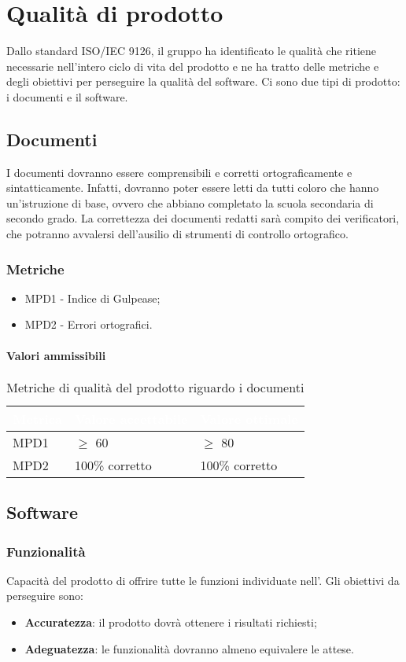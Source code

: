 \section{Qualità di prodotto}
Dallo standard ISO/IEC 9126, il gruppo \Gruppo{} ha identificato le qualità che ritiene necessarie nell'intero ciclo di vita del prodotto e ne ha tratto delle metriche e degli obiettivi per perseguire la qualità del software. Ci sono due tipi di prodotto: i documenti e il software.

\subsection{Documenti}
I documenti dovranno essere comprensibili e corretti ortograficamente e sintatticamente. Infatti, dovranno poter essere letti da tutti coloro che hanno un'istruzione di base, ovvero che abbiano completato la scuola secondaria di secondo grado. La correttezza dei documenti redatti sarà compito dei verificatori, che potranno avvalersi dell'ausilio di strumenti di controllo ortografico. 

\subsubsection{Metriche}
\begin{itemize}
\item MPD1 - Indice di Gulpease;
\item MPD2 - Errori ortografici.
\end{itemize} 
\paragraph{Valori ammissibili}
\renewcommand{\arraystretch}{1.5}
\begin{longtable}{C{2.5cm} C{4cm} C{4cm}}
\textcolor{white}{\textbf{Metrica}}&
\textcolor{white}{\textbf{Valore accettabile}}&
\textcolor{white}{\textbf{Valore ottimale}}\\	
\endhead
\endfoot
{}\caption{Metriche di qualità del prodotto riguardo i documenti}
\endlastfoot
		MPD1 &  
		$\geq$ 60 & 
		$\geq$ 80\\
		MPD2 & 
		100\% corretto & 
		100\% corretto \\
\end{longtable}
\subsection{Software}
\subsubsection{Funzionalità}
Capacità del prodotto di offrire tutte le funzioni individuate nell'\AdRv{}. Gli obiettivi da perseguire sono:
\begin{itemize}
\item \textbf{Accuratezza}: il prodotto dovrà ottenere i risultati richiesti;
\item \textbf{Adeguatezza}: le funzionalità dovranno almeno equivalere le attese.
\end{itemize}
